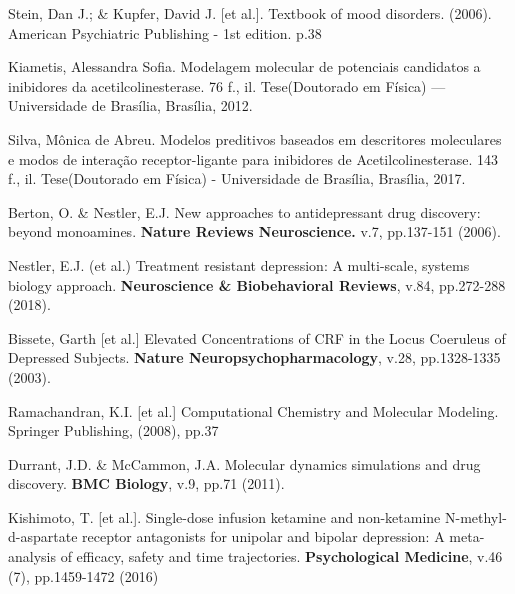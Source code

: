 \begin{thebibliography}{00}
     Stein, Dan J.; \& Kupfer, David J. [et al.]. Textbook of mood disorders. (2006). American Psychiatric Publishing - 1st edition. p.38
    
     Kiametis, Alessandra Sofia. Modelagem molecular de potenciais candidatos a inibidores da acetilcolinesterase. 76 f., il. Tese(Doutorado em Física) — Universidade de Brasília, Brasília, 2012.
    
     Silva, Mônica de Abreu. Modelos preditivos baseados em descritores moleculares e modos de interação receptor-ligante para inibidores de Acetilcolinesterase. 143 f., il. Tese(Doutorado em Física) - Universidade de Brasília, Brasília, 2017.
    
     Berton, O. \& Nestler, E.J. New approaches to antidepressant drug discovery: beyond monoamines. \textbf{Nature Reviews Neuroscience.} v.7, pp.137-151 (2006). 
    
     Nestler, E.J. (et al.) Treatment resistant depression: A multi-scale, systems biology approach.
                 \textbf{Neuroscience & Biobehavioral Reviews}, v.84, pp.272-288 (2018).
                 
     Bissete, Garth [et al.] Elevated Concentrations of CRF in the Locus Coeruleus of Depressed Subjects. \textbf{Nature Neuropsychopharmacology}, v.28, pp.1328-1335 (2003).
    
     Ramachandran, K.I. [et al.] Computational Chemistry and Molecular Modeling. Springer Publishing, (2008), pp.37
    
     Durrant, J.D. \& McCammon, J.A. Molecular dynamics simulations and drug discovery. \textbf{BMC Biology}, v.9, pp.71 (2011).
    
     Kishimoto, T. [et al.]. Single-dose infusion ketamine and non-ketamine N-methyl-d-aspartate receptor antagonists for unipolar and bipolar depression: A meta-analysis of efficacy, safety and time trajectories. \textbf{Psychological Medicine}, v.46 (7), pp.1459-1472 (2016)
    
\end{thebibliography}